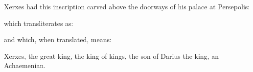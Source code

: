 \documentclass{article}
\begin{document}
    Xerxes had this inscription carved above the doorways of his palace
at Persepolis:
\begin{center}
\textcopsn{\xerxes}
\end{center}
which transliterates as: 
\begin{center}
\translitcopsn{\xerxes} 
\end{center}
and which, when translated, means: 
\begin{center}
Xerxes, the great king, the king of kings, the son of Darius the king,
an Achaemenian.
\end{center}
\end{document}
